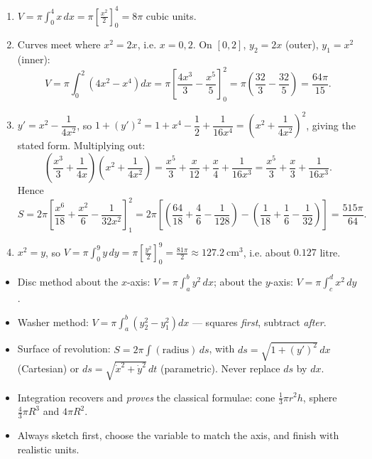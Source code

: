 \documentclass[11pt]{article}
\begin{document}
\begin{corrige}[Exercise 1]
\begin{enumerate}
\item $V=\pi\displaystyle\int_{0}^{4}x\,dx=\pi\left[\frac{x^{2}}{2}\right]_{0}^{4}=8\pi$ cubic units.
\item Curves meet where $x^{2}=2x$, i.e. $x=0,2$. On $[0,2]$, $y_{2}=2x$ (outer), $y_{1}=x^{2}$ (inner):
\[ V=\pi\int_{0}^{2}\left(4x^{2}-x^{4}\right)dx=\pi\left[\frac{4x^{3}}{3}-\frac{x^{5}}{5}\right]_{0}^{2}=\pi\left(\frac{32}{3}-\frac{32}{5}\right)=\frac{64\pi}{15}. \]
\item $y'=x^{2}-\dfrac{1}{4x^{2}}$, so $1+(y')^{2}=1+x^{4}-\dfrac{1}{2}+\dfrac{1}{16x^{4}}=\left(x^{2}+\dfrac{1}{4x^{2}}\right)^{2}$, giving the stated form. Multiplying out:
\[ \left(\frac{x^{3}}{3}+\frac{1}{4x}\right)\left(x^{2}+\frac{1}{4x^{2}}\right)=\frac{x^{5}}{3}+\frac{x}{12}+\frac{x}{4}+\frac{1}{16x^{3}}=\frac{x^{5}}{3}+\frac{x}{3}+\frac{1}{16x^{3}}. \]
Hence
\[ S=2\pi\left[\frac{x^{6}}{18}+\frac{x^{2}}{6}-\frac{1}{32x^{2}}\right]_{1}^{2}
=2\pi\left[\left(\frac{64}{18}+\frac{4}{6}-\frac{1}{128}\right)-\left(\frac{1}{18}+\frac{1}{6}-\frac{1}{32}\right)\right]
=\frac{515\pi}{64}. \]
\item $x^{2}=y$, so $V=\pi\displaystyle\int_{0}^{9}y\,dy=\pi\left[\frac{y^{2}}{2}\right]_{0}^{9}=\frac{81\pi}{2}\approx 127.2\ \mathrm{cm^{3}}$, i.e. about $0.127$ litre.
\end{enumerate}
\end{corrige}

\begin{aretenir}
\begin{itemize}
\item Disc method about the $x$-axis: $V=\pi\displaystyle\int_{a}^{b}y^{2}\,dx$; about the $y$-axis: $V=\pi\displaystyle\int_{c}^{d}x^{2}\,dy$.
\item Washer method: $V=\pi\displaystyle\int_{a}^{b}\left(y_{2}^{2}-y_{1}^{2}\right)dx$ — squares \emph{first}, subtract \emph{after}.
\item Surface of revolution: $S=2\pi\displaystyle\int(\text{radius})\,ds$, with $ds=\sqrt{1+(y')^{2}}\,dx$ (Cartesian) or $ds=\sqrt{\dot{x}^{2}+\dot{y}^{2}}\,dt$ (parametric). Never replace $ds$ by $dx$.
\item Integration recovers and \emph{proves} the classical formulae: cone $\tfrac13\pi r^{2}h$, sphere $\tfrac43\pi R^{3}$ and $4\pi R^{2}$.
\item Always sketch first, choose the variable to match the axis, and finish with realistic units.
\end{itemize}
\end{aretenir}
\end{document}
